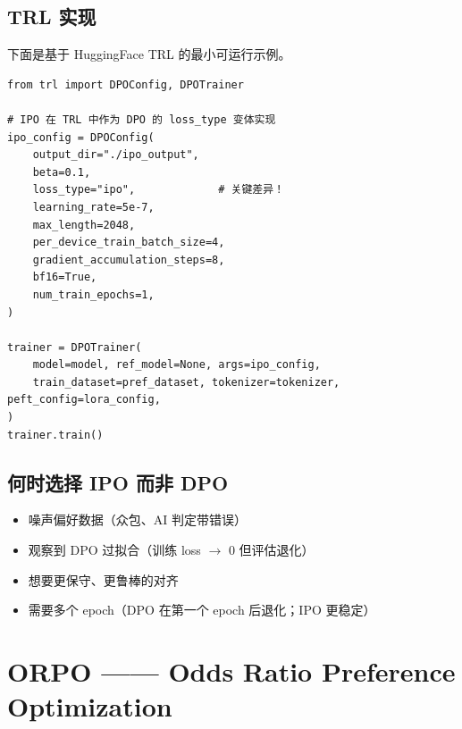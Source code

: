\subsection{TRL 实现}
\label{trl-implementation-2}

下面是基于 HuggingFace TRL 的最小可运行示例。

\begin{lstlisting}[style=pythonstyle]
from trl import DPOConfig, DPOTrainer

# IPO 在 TRL 中作为 DPO 的 loss_type 变体实现
ipo_config = DPOConfig(
    output_dir="./ipo_output",
    beta=0.1,
    loss_type="ipo",             # 关键差异！
    learning_rate=5e-7,
    max_length=2048,
    per_device_train_batch_size=4,
    gradient_accumulation_steps=8,
    bf16=True,
    num_train_epochs=1,
)

trainer = DPOTrainer(
    model=model, ref_model=None, args=ipo_config,
    train_dataset=pref_dataset, tokenizer=tokenizer, peft_config=lora_config,
)
trainer.train()
\end{lstlisting}

\subsection{何时选择 IPO 而非 DPO}
\label{when-to-choose-ipo-over-dpo}

\begin{itemize}
  \item 噪声偏好数据（众包、AI 判定带错误）
  \item 观察到 DPO 过拟合（训练 loss $\to$ 0 但评估退化）
  \item 想要更保守、更鲁棒的对齐
  \item 需要多个 epoch（DPO 在第一个 epoch 后退化；IPO 更稳定）
\end{itemize}

\section{ORPO —— Odds Ratio Preference Optimization}
\label{sec:orpo}

